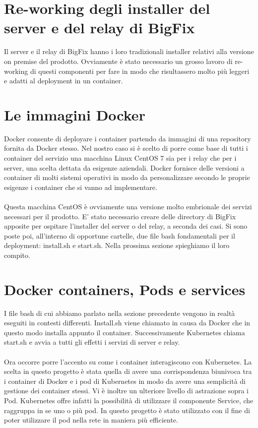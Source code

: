 \section{Re-working degli installer del server e del relay di BigFix}
Il server e il relay di BigFix hanno i loro tradizionali installer relativi alla versione on premise del prodotto. Ovviamente è stato necessario un grosso lavoro di re-working di questi componenti per fare in modo che risultassero molto più leggeri e adatti al deployment in un container.

\section{Le immagini Docker}
Docker consente di deployare i container partendo da immagini di una repository fornita da Docker stesso. Nel nostro caso si è scelto di porre come base di tutti i container del servizio una macchina Linux CentOS 7 sia per i relay che per i server, una scelta dettata da esigenze aziendali. Docker fornisce delle versioni a container di molti sistemi operativi in modo da personalizzare secondo le proprie esigenze i container che si vanno ad implementare.

\paragraph{}
Questa macchina CentOS è ovviamente una versione molto embrionale dei servizi necessari per il prodotto. E' stato necessario creare delle directory di BigFix apposite per ospitare l'installer del server o del relay, a seconda dei casi. Si sono poste poi, all'interno di opportune cartelle, due file bash fondamentali per il deployment: install.sh e start.sh. Nella prossima sezione spieghiamo il loro compito.

\section{Docker containers, Pods e services}
I file bash di cui abbiamo parlato nella sezione precedente vengono in realtà eseguiti in contesti differenti. Install.sh viene chiamato in causa da Docker che in questo modo installa appunto il container. Successivamente Kubernetes chiama start.sh e avvia a tutti gli effetti i servizi di server e relay.
\paragraph{}
Ora occorre porre l'accento su come i container interagiscono con Kubernetes. La scelta in questo progetto è stata quella di avere una corrispondenza biunivoca tra i container di Docker e i pod di Kubernetes in modo da avere una semplicità di gestione dei container stessi. Vi è inoltre un ulteriore livello di astrazione sopra i Pod. Kubernetes offre infatti la possibilità di utilizzare il componente Service, che raggruppa in se uno o più pod. In questo progetto è stato utilizzato con il fine di poter utilizzare il pod nella rete in maniera più efficiente.
